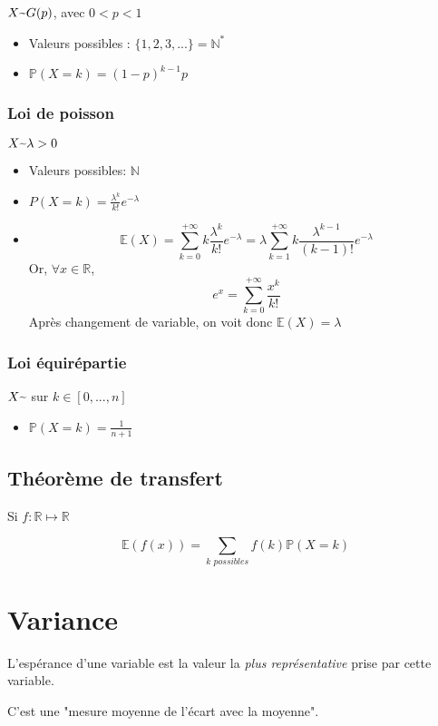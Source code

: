 \documentclass{article}
\newcommand{\textapprox}{\raisebox{0.5ex}{\texttildelow}}
\begin{document}
$X \textapprox G(p)$, avec $0<p<1$
  \begin{itemize}
    \item Valeurs possibles : $\{1,2,3,...\}=\mathbb{N}^{*}$
    \item $ \mathbb{P}(X=k)=(1-p)^{k-1}p$
  \end{itemize}

\subsubsection{Loi de poisson}

$X \textapprox \lambda > 0$
  \begin{itemize}
    \item Valeurs possibles: $\mathbb{N}$
    \item $P(X=k)= \frac{\lambda^{k}}{k!}e^{-\lambda}$
    \item $$ \mathbb{E}(X) = \sum_{k=0}^{+ \infty} k \frac{\lambda^k}{k!}e^{-\lambda} = \lambda \sum_{k=1}^{+ \infty} k \frac{\lambda^{k-1}}{(k-1)!}e^{-\lambda} $$
    Or, $\forall x \in \mathbb{R}$, $$e^x = \sum_{k=0}^{+ \infty} \frac{x^k}{k!}$$
    Après changement de variable, on voit donc $\mathbb{E}(X) = \lambda$
  \end{itemize}

\subsubsection{Loi équirépartie}

$X \textapprox $ sur $k \in [0,...,n]$
  \begin{itemize}
    \item $\mathbb{P}(X=k) = \frac{1}{n+1}$
  \end{itemize}

\subsection{Théorème de transfert}
Si $f: \mathbb{R} \mapsto \mathbb{R}$

$$\mathbb{E}(f(x)) = \sum_{\textit{k possibles}} f(k) \mathbb{P}(X=k)$$

\section{Variance}

L'espérance d'une variable est la valeur la \textit{plus représentative} prise
par cette variable.

C'est une "mesure moyenne de l'écart avec la moyenne".
\end{document}
